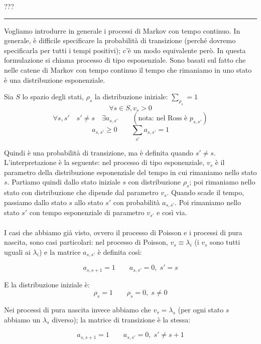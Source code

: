 \documentclass[a4paper,12pt]{book}
\begin{document}
??? %

 \vspace{1cm}
 \hrule
 \vspace{1cm}

 Vogliamo introdurre in generale i processi di Markov con tempo continuo. In generale, è difficile specificare la probabilità di transizione (perché dovremo specificarla per tutti i tempi positivi); c'è un modo equivalente però. In questa formulazione si chiama processo di tipo esponenziale. Sono basati sul fatto che nelle catene di Markov con tempo continuo il tempo che rimaniamo in uno stato è una distribuzione esponenziale. 
 
 Sia $ S $ lo spazio degli stati, $ \rho_s $ la distribuzione iniziale: $ \sum_{\rho_s} = 1 $
 $$ \forall s \in S, v_s > 0 $$
 $$ \forall s,s' \quad s' \ne s \quad \exists a_{s,s'} \qquad (\text{nota: nel Ross è } p_{s,s'}) $$
 $$ a_{s,s'} \ge 0 \qquad \sum_{s'} a_{s,s'} = 1 $$

Quindi è una probabilità di transizione, ma è definita quando $ s' \ne s $. L'interpretazione è la seguente: nel processo di tipo esponenziale, $ v_s $ è il parametro della distribuzione esponenziale del tempo in cui rimaniamo nello stato $ s $. Partiamo quindi dallo stato iniziale $ s $ con distribuzione $\rho_s$; poi rimaniamo nello stato con distribuzione che dipende dal parametro $ v_s $. Quando scade il tempo, passiamo dallo stato $ s $ allo stato $ s' $ con probabilità $ a_{s,s'} $. Poi rimaniamo nello stato $ s' $ con tempo esponenziale di parametro $ v_{s'} $ e così via. \\
\\
I casi che abbiamo già visto, ovvero il processo di Poisson e i processi di pura nascita, sono casi particolari: nel processo di Poisson, $ v_s \equiv \lambda_{i} $ (i $ v_s $ sono tutti uguali ai $\lambda_{i}$) e la matrice $ a_{s,s'} $ è definita così:

$$ a_{s,s+1} = 1 \qquad a_{s,s'} = 0, \; s' = s $$ %

E la distribuzione iniziale è: 
$$ \rho_s = 1 \qquad \rho_s = 0, \; s \ne 0 $$ 

Nei processi di pura nascita invece abbiamo che $ v_s = \lambda_ s $ (per ogni stato $ s $ abbiamo un $\lambda_{s}$ diverso); la matrice di transizione è la stessa:

$$ a_{s,s+1} = 1 \qquad a_{s,s'} = 0, \; s' \ne s+1 $$ 
\end{document}
